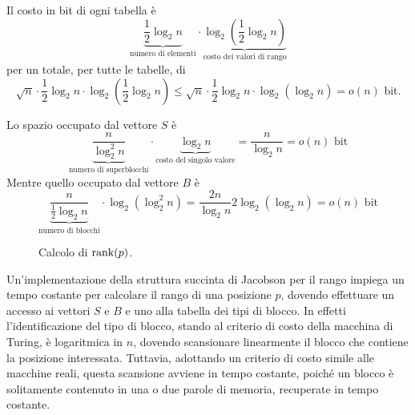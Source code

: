 Il costo in bit di ogni tabella è
\begin{equation*}
	\underbrace{\frac{1}{2}\log_2 n}_\text{numero di elementi}\cdot \underbrace{\log_2\left(\frac{1}{2}\log_2 n\right)}_\text{costo dei valori di rango}
\end{equation*}
per un totale, per tutte le tabelle, di
\begin{equation*}
	\sqrt n\cdot\frac{1}{2}\log_2 n\cdot \log_2\left(\frac{1}{2}\log_2 n\right)
	\leq \sqrt n\cdot \frac{1}{2}\log_2 n\cdot \log_2(\log_2 n) = o(n) \text{ bit.}
\end{equation*}

Lo spazio occupato dal vettore $S$ è
\begin{equation*}
	\underbrace{\frac{n}{\log_2^2 n}}_\text{numero di superblocchi}\cdot\underbrace{\log_2 n}_\text{costo del singolo valore} = \frac{n}{\log_2 n} = o(n) \text{ bit}
\end{equation*}
Mentre quello occupato dal vettore $B$ è
\begin{equation*}
	\underbrace{\frac{n}{\frac{1}{2}\log_2 n}}_\text{numero di blocchi} \cdot\log_2(\log_2^2 n) =
	\frac{2n}{\log_2 n} 2 \log_2(\log_2 n) = o(n) \text{ bit}
\end{equation*}

\begin{figure}
	\centering
	
	\caption{Calcolo di $\mathrm{rank}(p)$.}
	\label{fig:example_rank_p}
\end{figure}

Un'implementazione della struttura succinta di Jacobson per il rango impiega un tempo costante per calcolare il rango di una posizione $p$, dovendo effettuare un accesso ai vettori $S$ e $B$ e uno alla tabella dei tipi di blocco. In effetti l'identificazione del tipo di blocco, stando al criterio di costo della macchina di Turing, è logaritmica in $n$, dovendo scansionare linearmente il blocco che contiene la posizione interessata. Tuttavia, adottando un criterio di costo simile alle macchine reali, questa scansione avviene in tempo costante, poiché un blocco è solitamente contenuto in una o due parole di memoria, recuperate in tempo costante.






